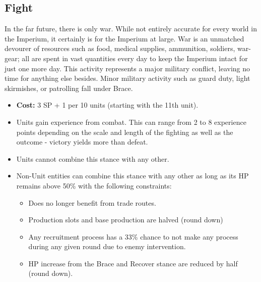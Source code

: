 \subsection{Fight}\label{fight_stance}
In the far future, there is only war. While not entirely accurate for every world in the Imperium, it certainly is for the Imperium at large. War is an unmatched devourer of resources such as food, medical supplies, ammunition, soldiers, war-gear; all are spent in vast quantities every day to keep the Imperium intact for just one more day. 
This activity represents a major military conflict, leaving no time for anything else besides. Minor military activity such as guard duty, light skirmishes, or patrolling fall under Brace.
\begin{itemize}
	\item \textbf{Cost:} 3 SP + 1 per 10 units (starting with the 11th unit).
	\item Units gain experience from combat. This can range from 2 to 8 experience points depending on the scale and length of the fighting as well as the outcome - victory yields more than defeat.
	\item Units cannot combine this stance with any other.
	\item Non-Unit entities can combine this stance with any other as long as its HP remains above 50\% with the following constraints: 
	\begin{itemize}
		\item Does no longer benefit from trade routes.
		\item Production slots and base production are halved (round down)
		\item Any recruitment process has a 33\% chance to not make any process during any given round due to enemy intervention.
		\item HP increase from the Brace and Recover stance are reduced by half (round down).
	\end{itemize}
\end{itemize}

